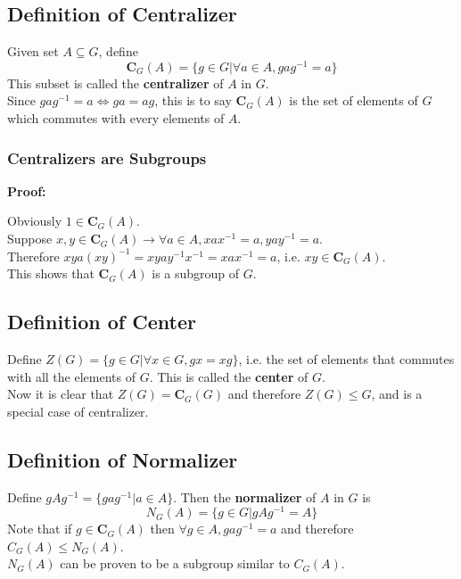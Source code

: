 \documentclass{article}
\begin{document}
\subsection*{Definition of Centralizer}
Given set $A \subseteq G$, define
\begin{equation*}
    \mathbf{C}_G(A) = \{g \in G | \forall a \in A, gag^{-1} = a\}
\end{equation*}
This subset is called the \textbf{centralizer} of $A$ in $G$.\\
Since $gag^{-1} = a \iff ga = ag$, this is to say $\mathbf{C}_G(A)$ is the set of elements of $G$ which commutes with every elements of $A$.
\subsubsection*{Centralizers are Subgroups}
\textbf{Proof:}
\begin{addmargin}[1em]{0em}
    Obviously $1 \in \mathbf{C}_G(A)$.\\
    Suppose $x, y \in \mathbf{C}_G(A) \rightarrow \forall a \in A, xax^{-1} = a, yay^{-1} = a$.\\
    Therefore $xya(xy)^{-1} = xyay^{-1}x^{-1} = xax^{-1} = a$, i.e. $xy \in \mathbf{C}_G(A)$.\\
    This shows that $\mathbf{C}_G(A)$ is a subgroup of $G$.
\end{addmargin}
\subsection*{Definition of Center}
Define $Z(G) = \{g \in G | \forall x \in G, gx =xg\}$, i.e. the set of elements that commutes with all the elements of $G$. This is called the \textbf{center} of $G$.\\
Now it is clear that $Z(G) = \mathbf{C}_G(G)$ and therefore $Z(G) \leq G$, and is a special case of centralizer.
\subsection*{Definition of Normalizer}
Define $gAg^{-1} = \{gag^{-1}| a \in A\}$. Then the \textbf{normalizer} of $A$ in $G$ is
\begin{equation*}
    N_G(A) = \{g \in G | gAg^{-1} = A\}
\end{equation*}
Note that if $g \in \mathbf{C}_G(A)$ then $\forall g \in A, gag^{-1} = a$ and therefore $C_G(A) \leq N_G(A)$.\\
$N_G(A)$ can be proven to be a subgroup similar to $C_G(A)$.
\end{document}
